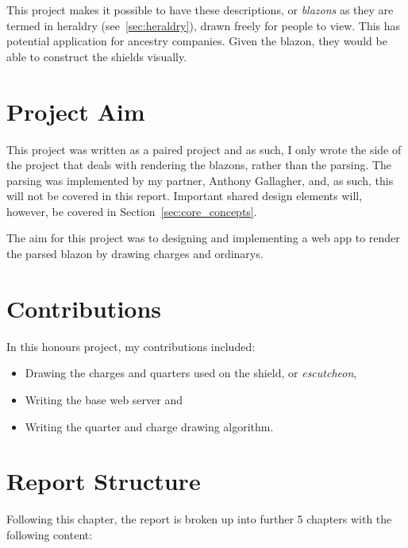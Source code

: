 \documentclass[nobib, a4paper, twoside, justified]{tufte-book}
\makeatletter
\newcommand{\charge}{\gls{charge}\@\xspace}
\newcommand{\charges}{\glspl{charge}\@\xspace}
\newcommand{\quarter}{\gls{quarter}\@\xspace}
\newcommand{\quarters}{\glspl{quarter}\@\xspace}
\newcommand{\blazon}{\gls{blazon}\@\xspace}
\newcommand{\blazons}{\glspl{blazon}\@\xspace}
\makeatother
\begin{document}
This project makes it possible to have these descriptions, or \textit{\blazons} as they are termed
in heraldry (see~\ref{sec:heraldry}), drawn freely for people to view. This has potential
application for ancestry companies. Given the \blazon, they would be able to construct the shields
visually.

\section{Project Aim}%
\label{sec:project_aim}

This project was written as a paired project and as such, I only wrote the side of the project that
deals with rendering the \blazons, rather than the parsing. The parsing was implemented by my
partner, Anthony Gallagher, and, as such, this will not be covered in this report. Important shared
design elements will, however, be covered in Section~\ref{sec:core_concepts}.

The aim for this project was to designing and implementing a web app to render the parsed \blazon
by drawing \charges and \glspl{ordinary}.

\section{Contributions}%
\label{sec:contributions}

In this honours project, my contributions included:

\begin{itemize}
  \item Drawing the \charges and \quarters used on the shield, or \textit{\gls{escutcheon}},
  \item Writing the base web server and
  \item Writing the \quarter and \charge drawing algorithm.
\end{itemize}

\section{Report Structure}%
\label{sec:report_structure}

Following this chapter, the report is broken up into further 5 chapters with the following content:
\end{document}
